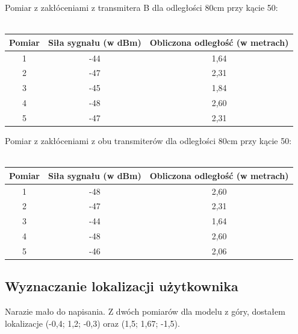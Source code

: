 \documentclass{article}
\begin{document}
		\begin{center}
			\begin{minipage}{\linewidth}
				Pomiar z zakłóceniami z transmitera B dla odległości 80cm przy kącie 50\textdegree :\\\\
				\begin{tabular}{|c|c|c|}
					\hline 
					Pomiar & Siła sygnału (w dBm) & Obliczona odległość (w metrach) \\ 
					\hline 
					1 & -44 & 1,64 \\ 
					\hline 
					2 & -47 & 2,31 \\ 
					\hline 
					3 & -45 & 1,84 \\ 
					\hline 
					4 & -48 & 2,60 \\ 
					\hline 
					5 & -47 & 2,31 \\ 
					\hline 
				\end{tabular}
			\end{minipage} 
		\end{center}
		\begin{center}
			\begin{minipage}{\linewidth}
				Pomiar z zakłóceniami z obu transmiterów dla odległości 80cm przy kącie 50\textdegree :\\\\
				\begin{tabular}{|c|c|c|}
					\hline 
					Pomiar & Siła sygnału (w dBm) & Obliczona odległość (w metrach) \\ 
					\hline 
					1 & -48 & 2,60 \\ 
					\hline 
					2 & -47 & 2,31 \\ 
					\hline 
					3 & -44 & 1,64 \\ 
					\hline 
					4 & -48 & 2,60 \\ 
					\hline 
					5 & -46 & 2,06 \\ 
					\hline 
				\end{tabular}
			\end{minipage} 
		\end{center}
	\subsection{Wyznaczanie lokalizacji użytkownika}
	  Narazie mało do napisania. Z dwóch pomiarów dla modelu z góry, dostałem lokalizacje (-0,4; 1,2; -0,3) oraz (1,5; 1,67; -1,5).
\end{document}
